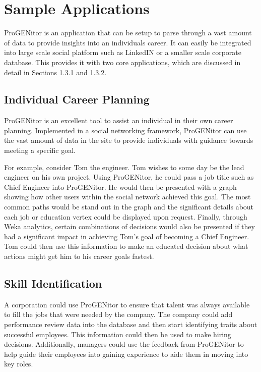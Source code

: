 \section{Sample Applications}
\label{sect:user-stories}
ProGENitor is an application that can be setup to parse through a vast amount
of data to provide insights into an individuals career.  It can easily be
integrated into large scale social platform such as LinkedIN or a smaller scale
corporate database.  This provides it with two core applications, which are
discussed in detail in Sections 1.3.1 and 1.3.2.

\subsection{Individual Career Planning}
ProGENitor is an excellent tool to assist an individual in their own career
planning.  Implemented in a social networking framework, ProGENitor can use the
vast amount of data in the site to provide individuals with
guidance towards meeting a specific goal.  

For example, consider Tom the engineer.  Tom wishes to some day be the lead
engineer on his own project.  Using ProGENitor, he could pass a job title such
as Chief Engineer into ProGENitor.  He would then be presented with a graph
showing how other users within the social network achieved this goal.  The most
common paths would be stand out in the graph and the significant details about
each job or education vertex could be displayed upon request.  Finally, through
Weka analytics, certain combinations of decisions would also be presented if
they had a significant impact in achieving Tom's goal of becoming a Chief
Engineer.  Tom could then use this information to make an  educated decision
about what actions might get him to his career goals fastest.

\subsection{Skill Identification}
A corporation could use ProGENitor to ensure that talent was always
available to fill the jobs that were needed by the company.  The company could
add performance review data into the database and then start identifying traits
about successful employees.  This information could then be used to make hiring
decisions.  Additionally, managers could use the feedback from ProGENitor to
help guide their employees into gaining experience to aide them in moving into
key roles.
	
